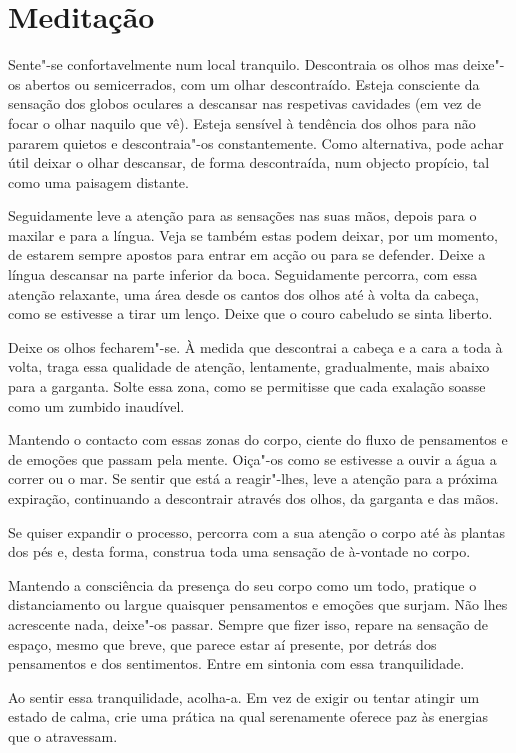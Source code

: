 
\chapter{Meditação}


Sente"-se confortavelmente num local tranquilo. Descontraia os olhos mas deixe"-os abertos ou semicerrados, com um olhar descontraído. Esteja consciente da sensação dos globos oculares a descansar nas respetivas cavidades (em vez de focar o olhar naquilo que vê). Esteja sensível à tendência dos olhos para não pararem quietos e descontraia"-os constantemente. Como alternativa, pode achar útil deixar o olhar descansar, de forma descontraída, num objecto propício, tal como uma paisagem distante.

Seguidamente leve a atenção para as sensações nas suas mãos, depois para o maxilar e para a língua. Veja se também estas podem deixar, por um momento, de estarem sempre apostos para entrar em acção ou para se defender. Deixe a língua descansar na parte inferior da boca. Seguidamente percorra, com essa atenção relaxante, uma área desde os cantos dos olhos até à volta da cabeça, como se estivesse a tirar um lenço. Deixe que o couro cabeludo se sinta liberto.

Deixe os olhos fecharem"-se. À medida que descontrai a cabeça e a cara a toda à volta, traga essa qualidade de atenção, lentamente, gradualmente, mais abaixo para a garganta. Solte essa zona, como se permitisse que cada exalação soasse como um zumbido inaudível.

Mantendo o contacto com essas zonas do corpo, ciente do fluxo de pensamentos e de emoções que passam pela mente. Oiça"-os como se estivesse a ouvir a água a correr ou o mar. Se sentir que está a reagir"-lhes, leve a atenção para a próxima expiração, continuando a descontrair através dos olhos, da garganta e das mãos.

Se quiser expandir o processo, percorra com a sua atenção o corpo até às plantas dos pés e, desta forma, construa toda uma sensação de à-vontade no corpo.

Mantendo a consciência da presença do seu corpo como um todo, pratique o distanciamento ou largue quaisquer pensamentos e emoções que surjam. Não lhes acrescente nada, deixe"-os passar. Sempre que fizer isso, repare na sensação de espaço, mesmo que breve, que parece estar aí presente, por detrás dos pensamentos e dos sentimentos. Entre em sintonia com essa tranquilidade.

Ao sentir essa tranquilidade, acolha-a. Em vez de exigir ou tentar atingir um estado de calma, crie uma prática na qual serenamente oferece paz às energias que o atravessam.


